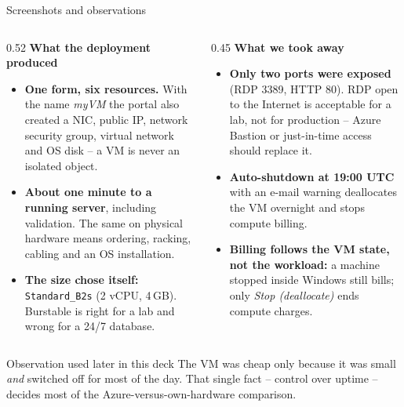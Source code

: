 \documentclass[aspectratio=169,xcolor=dvipsnames]{beamer}
\begin{document}
\begin{frame}[shrink=5]{Screenshots and observations}
	\begin{columns}[T]
		\begin{column}{0.52\textwidth}
			\textbf{\large What the deployment produced}
			\begin{itemize}
				\item \textbf{One form, six resources.} With the name \textit{myVM} the portal also created a NIC, public IP, network security group, virtual network and OS disk -- a VM is never an isolated object.
				\item \textbf{About one minute to a running server}, including validation. The same on physical hardware means ordering, racking, cabling and an OS installation.
				\item \textbf{The size chose itself:} \texttt{Standard\_B2s} (2 vCPU, 4\,GB). Burstable is right for a lab and wrong for a 24/7 database.
			\end{itemize}
		\end{column}
		
		\begin{column}{0.45\textwidth}
			\textbf{\large What we took away}
			\begin{itemize}
				\item \textbf{Only two ports were exposed} (RDP 3389, HTTP 80). RDP open to the Internet is acceptable for a lab, not for production -- Azure Bastion or just-in-time access should replace it.
				\item \textbf{Auto-shutdown at 19:00 UTC} with an e-mail warning deallocates the VM overnight and stops compute billing.
				\item \textbf{Billing follows the VM state, not the workload:} a machine stopped inside Windows still bills; only \textit{Stop (deallocate)} ends compute charges.
			\end{itemize}
		\end{column}
	\end{columns}
	
	\vspace{0.25cm}
	\begin{block}{Observation used later in this deck}
		The VM was cheap only because it was small \emph{and} switched off for most of the day. That single fact -- control over uptime -- decides most of the Azure-versus-own-hardware comparison.
	\end{block}
\end{frame}
\end{document}
